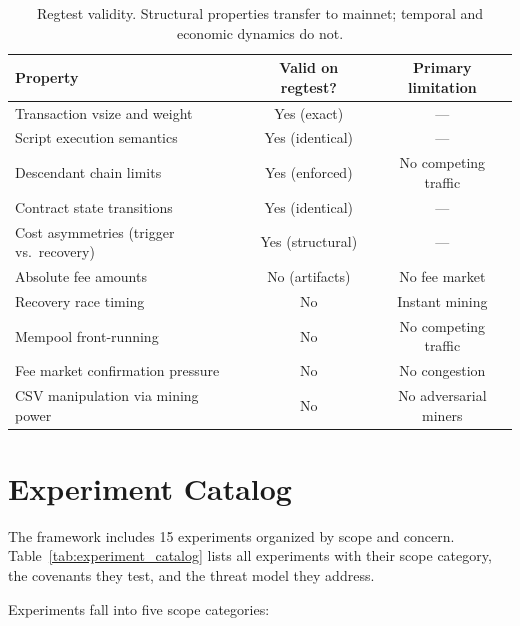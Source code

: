 \begin{table}[t]
\centering
\caption{Regtest validity. Structural properties transfer to mainnet; temporal and
economic dynamics do not.}
\label{tab:regtest_validity}
\small
\begin{tabular}{@{}lcc@{}}
\toprule
Property & Valid on regtest? & Primary limitation \\
\midrule
Transaction vsize and weight        & Yes (exact)     & --- \\
Script execution semantics          & Yes (identical) & --- \\
Descendant chain limits             & Yes (enforced)  & No competing traffic \\
Contract state transitions          & Yes (identical) & --- \\
Cost asymmetries (trigger vs.\ recovery) & Yes (structural) & --- \\
\midrule
Absolute fee amounts                & No (artifacts)  & No fee market \\
Recovery race timing                & No              & Instant mining \\
Mempool front-running               & No              & No competing traffic \\
Fee market confirmation pressure    & No              & No congestion \\
CSV manipulation via mining power   & No              & No adversarial miners \\
\bottomrule
\end{tabular}
\end{table}

\section{Experiment Catalog} \label{se:experiment_design}

The framework includes 15 experiments organized by scope and concern.
Table~\ref{tab:experiment_catalog} lists all experiments with their scope category,
the covenants they test, and the threat model they address.

Experiments fall into five scope categories:


